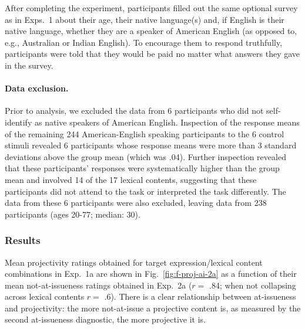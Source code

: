 \documentclass[11pt,fleqn]{article}
\newcommand{\6}{\mbox{$[\hspace*{-.6mm}[$}}
\newcommand{\9}{\mbox{$]\hspace*{-.6mm}]$}}
\newcommand{\figref}[1]{Fig.~\ref{#1}}
\begin{document}
After completing the experiment, participants filled out the same optional survey as in Exps.~1 about their age, their native language(s) and, if English is their native language, whether they are a speaker of American English (as opposed to, e.g., Australian or Indian English). To encourage them to respond truthfully, participants were told that they would be paid no matter what answers they gave in the survey.

\paragraph{Data exclusion.} Prior to analysis, we excluded the data from 6 participants who did not self-identify as native speakers of American English. Inspection of the response means of the remaining 244 American-English speaking participants to the 6 control stimuli revealed 6 participants whose response means were more than 3 standard deviations above the group mean (which was .04). Further inspection revealed that these participants' responses were systematically higher than the group mean and involved 14 of the 17 lexical contents, suggesting that these participants did not attend to the task or interpreted the task differently. The data from these 6 participants were also excluded, leaving data from 238 participants (ages 20-77; median: 30).


\subsubsection{Results}

Mean projectivity ratings obtained for target expression/lexical content combinations in Exp.~1a are shown in \figref{fig:f-proj-ai-2a} as a function of their mean not-at-issueness ratings obtained in Exp.~2a ($r =$ .84; when not collapsing across lexical contents $r =$ .6). There is a clear relationship between at-issueness and projectivity: the more not-at-issue a projective content is, as measured by the second at-issueness diagnostic, the more projective it is.
\end{document}
